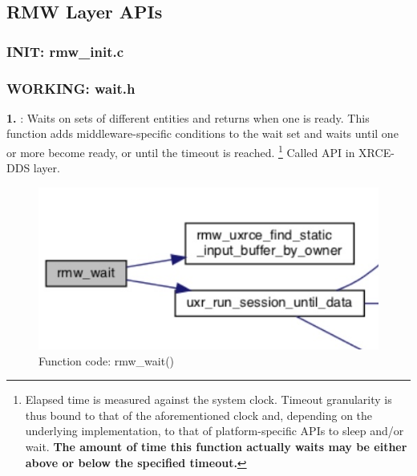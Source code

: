\subsection{RMW Layer APIs}
\subsubsection{INIT: rmw\_init.c}


\subsubsection{WORKING: wait.h}

\textbf{1. }: Waits on sets of different entities and returns when one is ready. This function adds middleware-specific conditions to the wait set and waits until one or more become ready, or until the timeout is reached. \footnote{Elapsed time is measured against the system clock. Timeout granularity is thus bound to that of the aforementioned clock and, depending on the underlying implementation, to that of platform-specific APIs to sleep and/or wait. \textbf{The amount of time this function actually waits may be either above or below the specified timeout.}} Called API  in XRCE-DDS layer.
\begin{figure}[htbp!]
    \centering
    \includegraphics[width=0.5\linewidth]{Sec/Implementation/rmw/fig/rmw_wait().jpg}
    \caption{Function code: rmw\_wait()}
    \vspace{-0.1in}
\end{figure}
